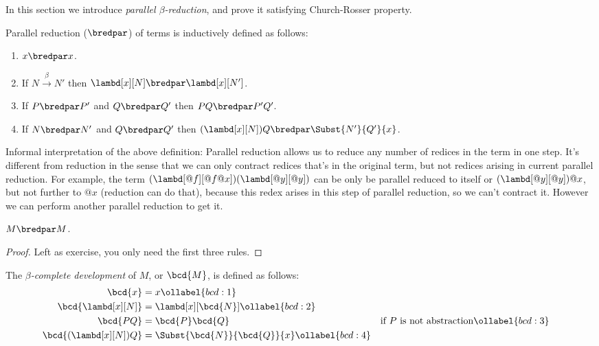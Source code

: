 \documentclass[../../../include/open-logic-section]{subfiles}
\begin{document}


In this section we introduce \emph{parallel $\beta$-reduction}, and
prove it satisfying Church-Rosser property.

\begin{defn} 
  Parallel reduction ($\bredpar$) of terms is inductively defined as follows:
  \begin{enumerate}
    \item {} $x \bredpar x$.
    \item {} If $N \xrightarrow{\beta} N'$ then $\lambd[x][N] \bredpar
      \lambd[x][N']$.
    \item {} If $P \bredpar P'$ and $Q \bredpar Q'$ then $PQ \bredpar
      P'Q'$.
    \item {} If $N \bredpar N'$ and $Q \bredpar Q'$ then
      $(\lambd[x][N])Q \bredpar \Subst{N'}{Q'}{x}$.
  \end{enumerate}
\end{defn}

Informal interpretation of the above definition: Parallel reduction allows us to reduce any number of redices in the
term in one step. It's different from reduction in the sense that we
can only contract redices that's in the original term, but not redices
arising in current parallel reduction. For example, the term
$(\lambd[@f][@f@x])(\lambd[@y][@y])$ can be only be parallel reduced
to itself or $(\lambd[@y][@y])@x$, but not further to $@x$ (reduction can do
that), because this redex arises in this step of parallel reduction,
so we can't contract it. However we can perform another parallel
reduction      to get it.

\begin{thm}
  $M \bredpar M$.
\end{thm}
\begin{proof}
  Left as exercise, you only need the first three rules.
\end{proof}

\begin{defn}
  The \emph{$\beta$-complete development} of $M$, or $\bcd{M}$, is defined
  as follows:
  \begin{align}
    \bcd{x} &= x \ollabel{bcd:1} \\
    \bcd{\lambd[x][N]} &= \lambd[x][\bcd{N}] \ollabel{bcd:2}\\
    \bcd{PQ} &= \bcd{P}\bcd{Q} && \text{if $P$ is not abstraction} \ollabel{bcd:3} \\
    \bcd{(\lambd[x][N])Q} &= \Subst{\bcd{N}}{\bcd{Q}}{x} \ollabel{bcd:4}
  \end{align}
\end{defn}
\end{document}
